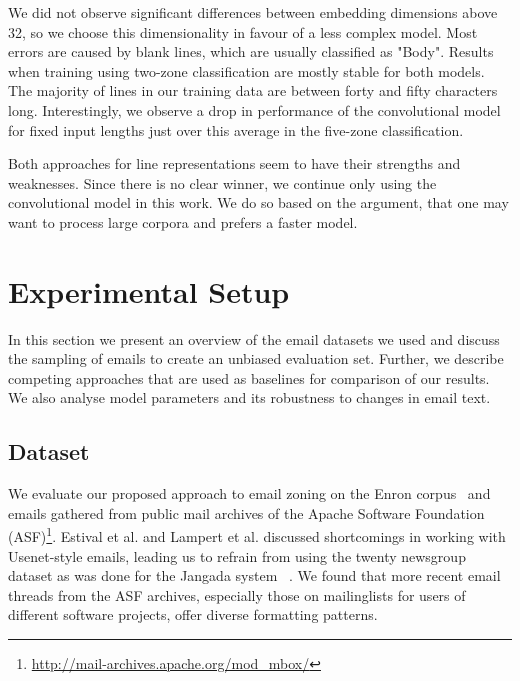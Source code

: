 \documentclass{llncs}
\begin{document}
We did not observe significant differences between embedding dimensions above 32, so we choose this dimensionality in favour of a less complex model.
Most errors are caused by blank lines, which are usually classified as "Body".
Results when training using two-zone classification are mostly stable for both models.
The majority of lines in our training data are between forty and fifty characters long.
Interestingly, we observe a drop in performance of the convolutional model for fixed input lengths just over this average in the five-zone classification.

Both approaches for line representations seem to have their strengths and weaknesses.
Since there is no clear winner, we continue only using the convolutional model in this work.
We do so based on the argument, that one may want to process large corpora and prefers a faster model.




\section{Experimental Setup}
In this section we present an overview of the email datasets we used and discuss the sampling of emails to create an unbiased evaluation set.
Further, we describe competing approaches that are used as baselines for comparison of our results.
We also analyse model parameters and its robustness to changes in email text.

\subsection{Dataset}
We evaluate our proposed approach to email zoning on the Enron corpus~\cite{enron} and emails gathered from public mail archives of the Apache Software Foundation (ASF)\footnote{\url{http://mail-archives.apache.org/mod\_mbox/}}. 
Estival et al. and Lampert et al. discussed shortcomings in working with Usenet-style emails, leading us to refrain from using the twenty newsgroup dataset as was done for the Jangada system ~\cite{profiling,zones,20news}.
We found that more recent email threads from the ASF archives, especially those on mailinglists for users of different software projects, offer diverse formatting patterns.
\end{document}
